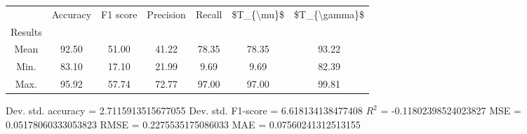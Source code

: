 \begin{tabular}{|c|c|c|c|c|c|c|}
\toprule
{} &  Accuracy &  F1 score &  Precision &  Recall &  \$T\_\{\textbackslash mu\}\$ &  \$T\_\{\textbackslash gamma\}\$ \\
Results &           &           &            &         &            &               \\
\hline
Mean    &     92.50 &     51.00 &      41.22 &   78.35 &      78.35 &         93.22 \\
Min.    &     83.10 &     17.10 &      21.99 &    9.69 &       9.69 &         82.39 \\
Max.    &     95.92 &     57.74 &      72.77 &   97.00 &      97.00 &         99.81 \\
\bottomrule
\end{tabular}

 Dev. std. accuracy = 2.7115913515677055
 Dev. std. F1-score = 6.618134138477408
 $R^2$ = -0.11802398524023827
 MSE = 0.05178060333053823
 RMSE = 0.2275535175086033
 MAE = 0.07560241312513155